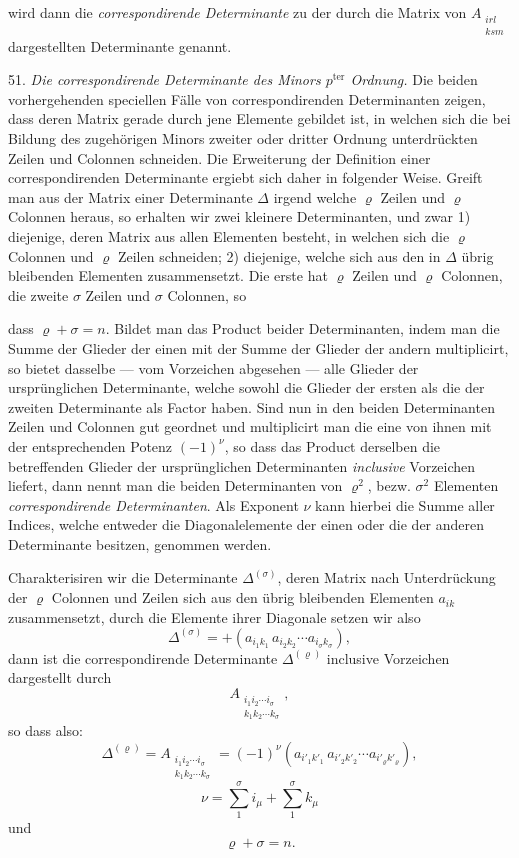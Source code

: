 wird dann die \textit{correspondirende Determinante} zu der durch die Matrix von
$A_{\substack{irl\\ksm}}$ dargestellten Determinante genannt.

51. \textit{Die correspondirende Determinante des Minors $p^{\text{ter}}$ Ordnung.} Die beiden
vorhergehenden speciellen F\"alle von correspondirenden Determinanten zeigen, dass deren Matrix
gerade durch jene Elemente gebildet ist, in welchen sich die bei Bildung des zugeh\"origen Minors
zweiter oder dritter Ordnung unterdr\"uckten Zeilen und Colonnen schneiden. Die Erweiterung der
Definition einer correspondirenden Determinante ergiebt sich daher in folgender Weise. Greift man
aus der Matrix einer Determinante $\varDelta$ irgend welche $\varrho$ Zeilen und $\varrho$
Colonnen heraus, so erhalten wir zwei kleinere Determinanten, und zwar 1) diejenige, deren Matrix
aus allen Elementen besteht, in welchen sich die $\varrho$ Colonnen und $\varrho$ Zeilen
schneiden; 2) diejenige, welche sich aus den in $\varDelta$ \"ubrig bleibenden Elementen
zusammensetzt. Die erste hat $\varrho$ Zeilen und $\varrho$ Colonnen, die zweite $\sigma$ Zeilen
und $\sigma$ Colonnen, so


dass $\varrho + \sigma = n$. Bildet man das Product beider Determinanten, indem man die Summe der Glieder der einen mit der Summe der Glieder der andern multiplicirt, so bietet dasselbe --- vom Vorzeichen abgesehen --- alle Glieder der ursprünglichen Determinante, welche sowohl die Glieder der ersten als die der zweiten Determinante als Factor haben. Sind nun in den beiden Determinanten Zeilen und Colonnen gut geordnet und multiplicirt man die eine von ihnen mit der entsprechenden Potenz $(-1)^{\nu}$, so dass das Product derselben die betreffenden Glieder der ursprünglichen Determinanten \textit{inclusive} Vorzeichen liefert, dann nennt man die beiden Determinanten von $\varrho^2$, bezw. $\sigma^2$ Elementen \textit{correspondirende Determinanten}. Als Exponent $\nu$ kann hierbei die Summe aller Indices, welche entweder die Diagonalelemente der einen oder die der anderen Determinante besitzen, genommen werden.

Charakterisiren wir die Determinante $\Delta^{(\sigma)}$, deren Matrix nach Unterdrückung der $\varrho$ Colonnen und Zeilen sich aus den übrig bleibenden Elementen $a_{ik}$ zusammensetzt, durch die Elemente ihrer Diagonale setzen wir also
\[
\Delta^{(\sigma)} = + (a_{i_1 k_1}\, a_{i_2 k_2} \cdots a_{i_\sigma k_\sigma}),
\]
dann ist die correspondirende Determinante $\Delta^{(\varrho)}$ inclusive Vorzeichen dargestellt durch
\[
A_{\substack{i_1 i_2 \cdots i_\sigma \\ k_1 k_2 \cdots k_\sigma}},
\]
so dass also:
\[
\Delta^{(\varrho)} = A_{\substack{i_1 i_2 \cdots i_\sigma \\ k_1 k_2 \cdots k_\sigma}} = (-1)^{\nu} (a_{i'_1 k'_1}\, a_{i'_2 k'_2} \cdots a_{i'_\varrho k'_\varrho}),
\]
\[
\nu = \sum_1^\sigma i_\mu + \sum_1^\sigma k_\mu
\]
und
\[
\varrho + \sigma = n.
\]

